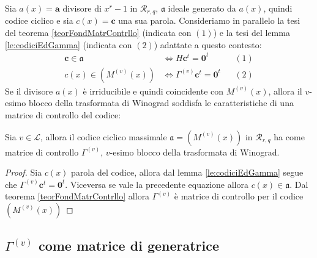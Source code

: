 Sia $a(x)=\mathbf{a}$ divisore di $x^{r} - 1$ in $\mathcal{R}_{r,q} $, $\mathfrak{a}$ ideale generato da $a(x)$, quindi codice ciclico e sia $c(x) = \mathbf{c}$ una sua parola. Consideriamo in parallelo la tesi del teorema \ref{teorFondMatrContrllo} (indicata con $(1)$) e la tesi del lemma \ref{le:codiciEdGamma} (indicata con $(2)$) adattate a questo contesto:
\begin{align*}
  \mathbf{c} \in \mathfrak{a} &\iff H \mathbf{c}^{t} = \mathbf{0}^{t}  & & (1) \\
  c(x) \in (M^{(v)}(x)) &\iff \Gamma^{(v)} \mathbf{c}^{t} = \mathbf{0}^{t} & & (2)
\end{align*}
Se il divisore $a(x)$ è irriducibile e quindi coincidente con $M^{(v)}(x)$, allora il $v$-esimo blocco della trasformata di Winograd soddisfa le caratteristiche di una matrice di controllo del codice:
\begin{teorema}
   Sia $v \in \mathscr{L}$, allora il codice ciclico massimale $\mathfrak{a} = (M^{(v)}(x))$ in $\mathcal{R}_{r,q}$ ha come matrice di controllo $\Gamma^{(v)} $, $v$-esimo blocco della trasformata di Winograd.
\end{teorema}
\begin{proof}
   Sia $c(x)$ parola del codice, allora dal lemma \ref{le:codiciEdGamma} segue che $\Gamma^{(v)} \mathbf{c}^{t} = \mathbf{0}^{t}$. Viceversa se vale la precedente equazione allora $c(x) \in \mathfrak{a}$. Dal teorema \ref{teorFondMatrContrllo} allora $\Gamma^{(v)}$ è matrice di controllo per il codice $(M^{(v)}(x))$
\end{proof}

\subsection{$\Gamma^{(v)}$ come matrice di generatrice}

